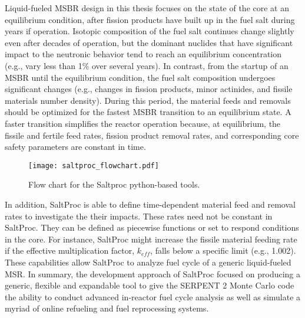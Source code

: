 Liquid-fueled \gls{MSBR} design in this thesis focuses on the state of the core at an equilibrium condition, after fission products have
built up in the fuel salt during years if operation. Isotopic composition of the fuel salt continues change slightly even after decades
of operation, but the dominant nuclides that have significant impact to the neutronic behavior tend to reach an equilibrium concentration
(e.g., vary less than 1\% over several years). In contrast, from the startup of an \gls{MSBR} until the equilibrium condition,
the fuel salt composition undergoes significant changes (e.g., changes in fission products, minor actinides, and fissile
materials number density). During this period, the material feeds and removals should be optimized for the fastest \gls{MSBR} transition to an
equilibrium state. A faster transition simplifies the reactor operation because, at equilibrium, the fissile and fertile feed rates,
fission product removal rates, and corresponding core safety parameters are constant in time.

\begin{figure}[htp!] %
  \centering
  \vspace{-0.3em}
  \texttt{[image: saltproc\_flowchart.pdf]}
  \caption{Flow chart for the Saltproc python-based tools.}
  \vspace{-1.0em}
  \label{fig:saltproc_flow}
\end{figure}
\FloatBarrier

In addition, SaltProc is able to define time-dependent material feed and removal rates to investigate the their impacts. These rates need not be
constant in SaltProc. They can be defined as piecewise functions or set to respond conditions in the core. For instance, SaltProc might increase the
fissile material feeding rate if the effective multiplication factor, $k_{eff}$, falls below a specific limit (e.g., 1.002).
These capabilities allow SaltProc to analyze fuel cycle of a generic liquid-fueled \gls{MSR}. In summary, the development approach of SaltProc focused
on producing a generic, flexible and expandable tool to give the SERPENT 2 Monte Carlo code the ability to conduct advanced in-reactor
fuel cycle analysis as well as simulate a myriad of online refueling and fuel reprocessing systems.

